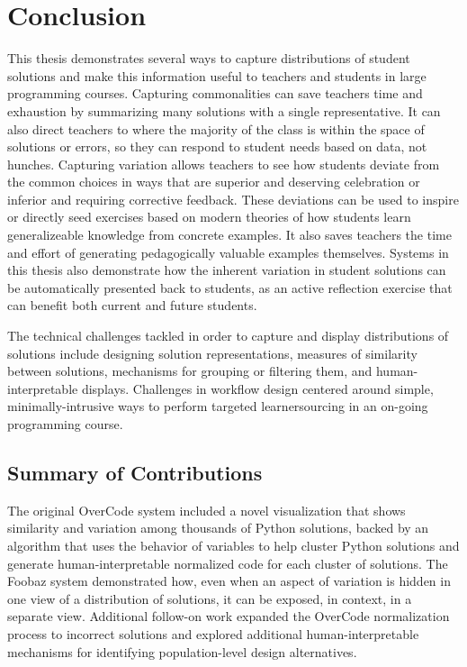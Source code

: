 \chapter{Conclusion}\label{chapter:conclusion}

This thesis demonstrates several ways to capture distributions of student solutions and make this information useful to teachers and students in large programming courses. Capturing commonalities can save teachers time and exhaustion by summarizing many solutions with a single representative. It can also direct teachers to where the majority of the class is within the space of solutions or errors, so they can respond to student needs based on data, not hunches. Capturing variation allows teachers to see how students deviate from the common choices in ways that are superior and deserving celebration or inferior and requiring corrective feedback. These deviations can be used to inspire or directly seed exercises based on modern theories of how students learn generalizeable knowledge from concrete examples. It also saves teachers the time and effort of generating pedagogically valuable examples themselves. Systems in this thesis also demonstrate how the inherent variation in student solutions can be automatically presented back to students, as an active reflection exercise that can benefit both current and future students. 

The technical challenges tackled in order to capture and display distributions of solutions include designing solution representations, measures of similarity between solutions, mechanisms for grouping or filtering them, and human-interpretable displays. Challenges in workflow design centered around simple, minimally-intrusive ways to perform targeted learnersourcing in an on-going programming course.

\section{Summary of Contributions}

The original OverCode system included a novel visualization that shows similarity and variation among thousands of Python solutions, backed by an algorithm that uses the behavior of variables to help cluster Python solutions and generate human-interpretable normalized code for each cluster of solutions. The Foobaz system demonstrated how, even when an aspect of variation is hidden in one view of a distribution of solutions, it can be exposed, in context, in a separate view. Additional follow-on work expanded the OverCode normalization process to incorrect solutions and explored additional human-interpretable mechanisms for identifying population-level design alternatives.

